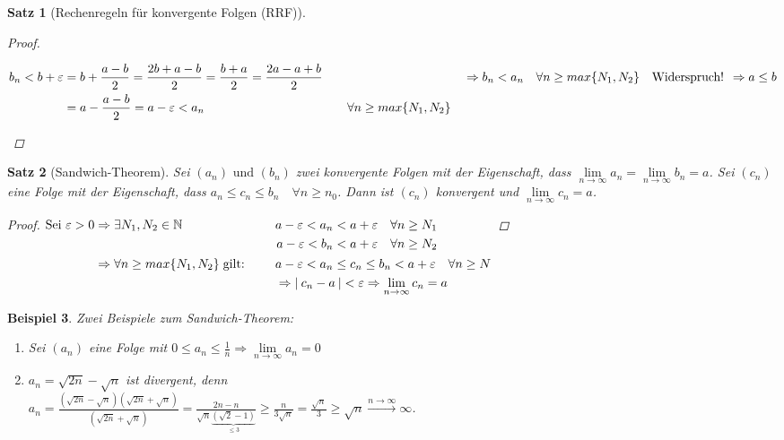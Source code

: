\documentclass[a4paper,titlepage,oneside]{article}
\def\N{\ensuremath{\mathbb{N}} }
\renewcommand{\epsilon}{\ensuremath{\varepsilon} }
\def\WSP{\text{Widerspruch! }}
\def\sp{\hspace{0,1cm}}
\renewcommand{\liminf}[2][n]{\ensuremath{\lim\limits_{#1 \rightarrow \infty}{#2}}}
\newcommand{\abs}[1]{\ensuremath{\left|\:#1\:\right|}}
\newcommand{\longtoinf}[1][n]{\ensuremath{\overset{\scriptscriptstyle{#1 \to \infty}}{\longrightarrow}}}
\theoremstyle{thmstyle}
\newtheorem{satz}{Satz}[section]
\newtheorem{bsp}[satz]{Beispiel}
\theoremstyle{subthmstyle}
\begin{document}
\begin{satz}[Rechenregeln für konvergente Folgen (RRF)]
\begin{proof}
\begin{enumerate}
\begin{math}
\begin{aligned}[t]
b_n < b + \epsilon &= b + \frac{a-b}{2} = \frac{2b + a - b}{2} = \frac{b + a}{2} = \frac{2a - a + b}{2} \\
&= a - \frac{a-b}{2} = a - \epsilon < a_n && \quad \forall n \ge max\{N_1, N_2\}
\end{aligned} \\
\Rightarrow  b_n < a_n \quad \forall n \ge max\{N_1, N_2\} \quad \WSP \Rightarrow a \le b
\end{math}
\end{enumerate}
\end{proof}
\end{satz}

\begin{satz}[Sandwich-Theorem]
Sei \((a_n)\text{ und }(b_n)\) zwei konvergente Folgen mit der Eigenschaft, dass \(\liminf{a_n} = \liminf{b_n} = a\).
Sei \((c_n)\) eine Folge mit der Eigenschaft, dass \(a_n \le c_n \le b_n \quad \forall n \ge n_0\).
Dann ist \((c_n)\) konvergent und \(\liminf{c_n} = a\).
\begin{proof}
\begin{math}
\begin{aligned}[t] \displaystyle \text{Sei }\epsilon > 0 &\Rightarrow \exists  N_1, N_2 \in \N \quad
&&\begin{aligned}[t] a - \epsilon < a_n < a + \epsilon & \quad \forall n \ge N_1 \\
			   a - \epsilon < b_n < a + \epsilon & \quad \forall n \ge N_2
\end{aligned} \\
&\Rightarrow \forall n \ge max\{N_1, N_2\} \sp \text{gilt: } \quad &&\begin{aligned}[t] &a-\epsilon < a_n \le c_n \le b_n < a + \epsilon \quad  \forall n \ge N \\
&\Rightarrow \abs{c_n - a} < \epsilon \Rightarrow \liminf{c_n} = a
\end{aligned}
\end{aligned}\\
\end{math}
\end{proof}
\end{satz}

\begin{bsp}
Zwei Beispiele zum Sandwich-Theorem:
\begin{enumerate}
\item Sei \((a_n)\) eine Folge mit \(0 \le a_n \le \frac{1}{n} \Rightarrow \liminf{a_n} = 0\)
\item \(a_n = \sqrt{2n} - \sqrt{n}\) ist divergent, denn \\
$ \displaystyle a_n = \frac{\left(\sqrt{2n} - \sqrt{n}\right)\left(\sqrt{2n} + \sqrt{n}\right)}{\left(\sqrt{2n} + \sqrt{n}\right)} = \frac{2n - n}{\sqrt{n} \underbrace{\left(\sqrt{2} - 1\right)}_{\le3}} \ge \frac{n}{3\sqrt{n}} = \frac{\sqrt{n}}{3} \ge \sqrt{n} \longtoinf \infty $.
\end{enumerate}
\end{bsp}
\end{document}
